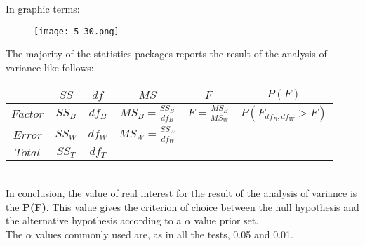 \begin{frame}
  \vspace*{.25cm}
  In graphic terms:\\
  \vspace*{.25cm}
  \begin{figure}
    \texttt{[image: 5\_30.png]}
  \end{figure}
\end{frame}

\begin{frame}
  \vspace*{.25cm}
  The majority of the statistics packages reports the result of the analysis of variance like follows:\\
  \vspace*{.5cm}
  \begin{tabular}{|c|c|c|c|c|c|}
    \hline
    & $SS$  & $df$ & $MS$  & $F$  &  $P(F)$ \\ \hline
    $Factor$  & $SS_B$  & $df_B$  &  $MS_B=\frac{SS_B}{df_B}$ &  $F=\frac{MS_B}{MS_W}$ & $P(F_{df_B,df_W}>F)$\\ \hline
    $Error$  &  $SS_W$ & $df_W$  & $MS_W=\frac{SS_W}{df_W}$  &   &   \\ \hline
    $Total$  & $SS_T$  & $df_T$  &   &   &   \\ \hline
  \end{tabular}\\
  \vspace*{.5cm}
  In conclusion, the value of real interest for the result of the analysis of variance is the \textbf{P(F)}. This value gives the criterion of choice between the null hypothesis and the alternative hypothesis according to a {\boldmath$\alpha$} value prior set.\\
  The {\boldmath$\alpha$} values commonly used are, as in all the tests, 0.05 and 0.01.
\end{frame}

